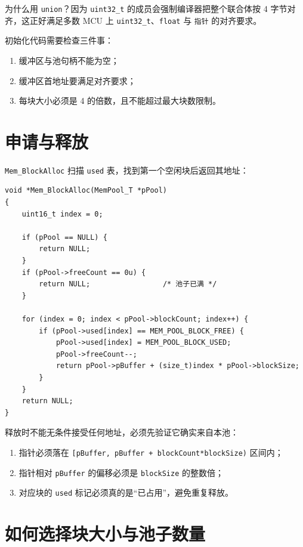为什么用 \texttt{union}？因为 \texttt{uint32\_t} 的成员会强制编译器把整个联合体按 4 字节对齐，这正好满足多数 MCU 上 \texttt{uint32\_t}、\texttt{float} 与 \texttt{指针} 的对齐要求。

初始化代码需要检查三件事：

\begin{enumerate}
\item 缓冲区与池句柄不能为空；
\item 缓冲区首地址要满足对齐要求；
\item 每块大小必须是 4 的倍数，且不能超过最大块数限制。
\end{enumerate}

\section{申请与释放}

\texttt{Mem\_BlockAlloc} 扫描 \texttt{used} 表，找到第一个空闲块后返回其地址：

\begin{lstlisting}[style=c]
void *Mem_BlockAlloc(MemPool_T *pPool)
{
    uint16_t index = 0;

    if (pPool == NULL) {
        return NULL;
    }
    if (pPool->freeCount == 0u) {
        return NULL;                 /* 池子已满 */
    }

    for (index = 0; index < pPool->blockCount; index++) {
        if (pPool->used[index] == MEM_POOL_BLOCK_FREE) {
            pPool->used[index] = MEM_POOL_BLOCK_USED;
            pPool->freeCount--;
            return pPool->pBuffer + (size_t)index * pPool->blockSize;
        }
    }
    return NULL;
}
\end{lstlisting}

释放时不能无条件接受任何地址，必须先验证它确实来自本池：

\begin{enumerate}
\item 指针必须落在 \texttt{[pBuffer, pBuffer + blockCount*blockSize)} 区间内；
\item 指针相对 \texttt{pBuffer} 的偏移必须是 \texttt{blockSize} 的整数倍；
\item 对应块的 \texttt{used} 标记必须真的是“已占用”，避免重复释放。
\end{enumerate}

\section{如何选择块大小与池子数量}

